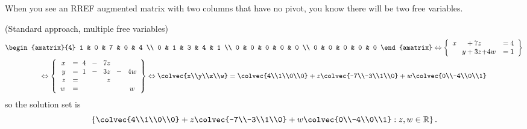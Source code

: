 When you see an RREF augmented matrix with two columns that have no pivot, you know there will be two free variables. 

\begin{example}{(Standard approach, multiple free variables)}
\begin{multline*}
 \begin{amatrix}{4} 
1 & 0 & 7 & 0 & 4 \\ 
0 & 1 & 3 & 4 & 1 \\ 
0 & 0 & 0 & 0 & 0 \\ 
0 & 0 & 0 & 0 & 0 
\end{amatrix}
\Leftrightarrow
\left\{
\begin{array}{lcr}
	x \phantom{+y}    + 7z  \phantom{+w} & = 4 \\
	\phantom {x+}   y + 3z  {+4w} & = 1 
     \end{array}
     \right\}
%
\\
\Leftrightarrow 
\left\{
\begin{array}{rlcrccrr}
	x & = \ 4&\! -\!&7z& \\
	 y  & = \ 1& \!-\!&3z&\!-\!&4w\\
	 z   & = &&z\\
	w & =&&&&w          
     \end{array}
     \right\}
     \Leftrightarrow
\colvec{x\\y\\z\\w} = \colvec{4\\1\\0\\0} + z\colvec{-7\\-3\\1\\0} + w\colvec{0\\-4\\0\\1}
\end{multline*}
so the solution set is 
\[  \left\{  \colvec{4\\1\\0\\0} + z\colvec{-7\\-3\\1\\0} + w\colvec{0\\-4\\0\\1} : z,w\in \mathbb{R} \right\}. \]
\end{example}

